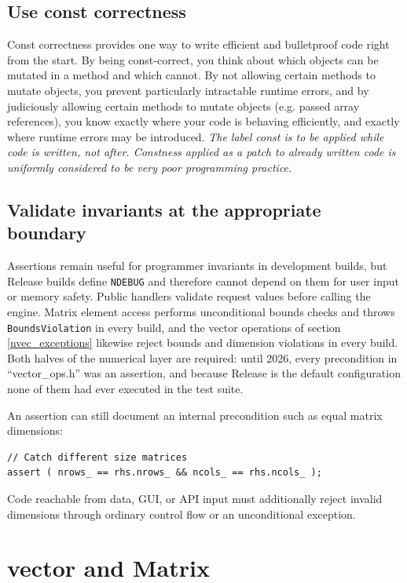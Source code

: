 \documentclass{report}
\begin{document}
\section{Use const correctness}

Const correctness provides one way to write efficient and bulletproof
code right from the start.  By being const-correct, you think about
which objects can be mutated in a method and which cannot.  By
not allowing certain methods to mutate objects, you prevent
particularly intractable runtime errors, and by judiciously allowing
certain methods to mutate objects (e.g. passed array references), you
know exactly where your code is behaving efficiently, and exactly
where
runtime errors may be introduced.  {\em The label const is to be
applied while code is written, not after.  Constness applied as a
patch to already written code is uniformly considered to be very poor
programming practice.}

\section{Validate invariants at the appropriate boundary}\label{validate_invariants}

Assertions remain useful for programmer invariants in development
builds, but Release builds define \texttt{NDEBUG} and therefore cannot
depend on them for user input or memory safety.  Public handlers
validate request values before calling the engine.  Matrix element
access performs unconditional bounds checks and throws
\texttt{BoundsViolation} in every build, and the vector operations of
section \ref{nvec_exceptions} likewise reject bounds and dimension
violations in every build.  Both halves of the numerical layer are
required: until 2026, every precondition in ``vector\_ops.h'' was an
assertion, and because Release is the default configuration none of
them had ever executed in the test suite.

An assertion can still document an internal precondition such as
equal matrix dimensions:
\begin{verbatim}
// Catch different size matrices
assert ( nrows_ == rhs.nrows_ && ncols_ == rhs.ncols_ );
\end{verbatim}
Code reachable from data, GUI, or API input must additionally reject
invalid dimensions through ordinary control flow or an unconditional
exception.

\chapter{vector and Matrix}\label{matrix_chapter}
\end{document}
